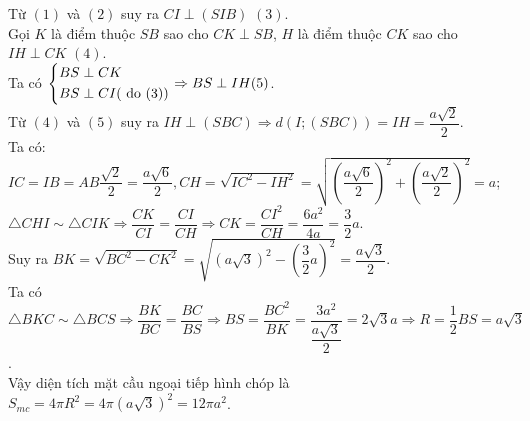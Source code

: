 \begin{ex}
{{\begin{tikzpicture}[scale=0.7]
	\end{tikzpicture}
}
\noindent Từ $(1)$ và $(2)$ suy ra $CI\perp (SIB)$ $(3)$.\\
Gọi $K$ là điểm thuộc $SB$ sao cho $CK\perp SB$, $H$ là điểm thuộc $CK$ sao cho $IH\perp CK$ $(4)$.\\
Ta có $\heva{&BS\perp CK\\&BS\perp CI (\text{ do } (3))}\Rightarrow BS\perp IH (5)$.\\
Từ $(4)$ và $(5)$ suy ra $IH\perp (SBC)\Rightarrow d(I;(SBC))=IH=\dfrac{a\sqrt{2}}{2}$.\\
Ta có:\\
$IC=IB=AB\dfrac{\sqrt{2}}{2}=\dfrac{a\sqrt{6}}{2}, CH=\sqrt{IC^2-IH^2}=\sqrt{\left(\dfrac{a\sqrt{6}}{2}\right)^2+\left(\dfrac{a\sqrt{2}}{2}\right)^2}=a$;\\
$\triangle CHI\sim\triangle CIK\Rightarrow \dfrac{CK}{CI}=\dfrac{CI}{CH}\Rightarrow CK=\dfrac{CI^2}{CH}=\dfrac{6a^2}{4a}=\dfrac{3}{2}a$.\\
Suy ra $BK=\sqrt{BC^2-CK^2}=\sqrt{(a\sqrt{3})^2-\left(\dfrac{3}{2}a\right)^2}=\dfrac{a\sqrt{3}}{2}$.\\
Ta có $\triangle BKC\sim\triangle BCS\Rightarrow \dfrac{BK}{BC}=\dfrac{BC}{BS}\Rightarrow BS=\dfrac{BC^2}{BK}=\dfrac{3a^2}{\dfrac{a\sqrt{3}}{2}}=2\sqrt{3}a\Rightarrow R=\dfrac{1}{2}BS=a\sqrt{3}$.\\
Vậy diện tích mặt cầu ngoại tiếp hình chóp là $S_{mc}=4\pi R^2=4\pi (a\sqrt{3})^2=12\pi a^2$.
}
\end{ex}

